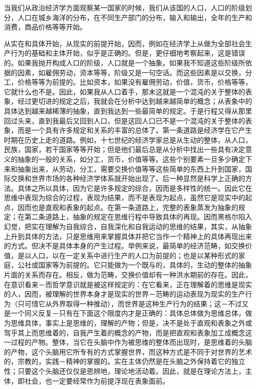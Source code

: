 \documentclass[a4paper,twoside,12pt]{ctexart}
\begin{document}
当我们从政治经济学方面观察某一国家的时候，我们从该国的人口，人口的阶级划分，人口在城乡海洋的分布，在不同生产部门的分布，输入和输出，全年的生产和消费，商品价格等等开始。

从实在和具体开始，从现实的前提开始，因而，例如在经济学上从做为全部社会生产行为的基础和主体开始，似乎是正确的。但是，更仔细地考察起来，这是错误的。如果我抛开构成人口的阶级，人口就是一个抽象。如果我不知道这些阶级所依据的因素，如雇佣劳动，资本等等，阶级又是一句空话。而这些因素是以交换，分工，价格等等为前提的。比如资本，如果没有雇佣劳动，价值，货币，价格等等，它就什么也不是。因此，如果我从人口着手，那末这就是一个混沌的关于整体的表象，经过更切进的规定之后，我就会在分析中达到越来越简单的概念；从表象中的具体达到越来越稀薄的抽象，直到我达到一些最简单的规定。于是行程又得从那里回过头来，直到我最后又回到人口，但是这回人口已不是一个混沌的关于整体的表象，而是一个具有许多规定和关系的丰富的总体了。第一条道路是经济学在它产生时期在历史上走的道路。例如，十七世纪的经济学家总是从生动的整体，从人口，民族，国家，若干国家等等开始；但是他们最后总是从分析中找出一些具有决定意义的抽象的一般的关系，如分工，货币，价值等等。这些个别要素一旦多少确定下来和抽象出来，从劳动，分工，需要交换价值等等这些简单的东西上升到国家，国际交换和世界市场的各种经济学体系就开始出现了。后一种显然是科学上正确的方法。具体之所以具体，因为它是许多规定的综合，因而是多样性的统一。因此它在思维中表现为综合的过程，表现为结果，而不是表现为起点，虽然它是现实中的起点，因而也是直观和表象的起点。在第一条道路上，完整的表象蒸发为抽象的规定；在第二条道路上，抽象的规定在思维行程中导致具体的再现。因而黑格尔陷入幻觉，把实在理解为自我综合，自我深化和自我运动的思维的结果，其实，从抽象上升到具体的方法，只是思维用来掌握具体并把它当作一个精神上的具体再现出来的方式。但决不是具体本身的产生过程。举例来说，最简单的经济范畴，如交换价值，是以人口，以在一定关系中进行生产的人口为前提的；也是以某种形式的家庭，公社或国家等为前提的。它只能做为一个既与的，具体的，生动的整体的抽象片面的关系而存在。相反，做为范畴，交换价值却有一种洪水期前的存在。因此，在意识看来－而哲学意识就是被这样规定的：在它看来，正在理解着的思维是现实的人，因而，被理解的世界本身才是现实的世界－范畴的运动表现为现实的生产行为（只可惜它从外界取得一种推动），而世界是这种生产行为的结果；这－不过又是一个同义反复－只有在下面这个限度内才是正确的：具体总体做为思维总体，做为思维具体，事实上是思维的，理解的产物；但是，决不是处于直观和表象之外或驾乎其上而思维着的，自我产生着的概念的产物，而是把直观和表象加工成概念这一过程的产物。整体，当它在头脑中作为被思维的整体而出现时，是思维着的头脑的产物，这个头脑用它所专有的方式掌握世界，而这种方式是不同于对世界的艺术的，宗教的，实践－精神的掌握的。实在主体仍然是在头脑之外保持着它的独立性；只要这个头脑还仅仅是思辨地，理论地活动着。因此，就是在理论方法上，主体，即社会，也一定要经常作为前提浮现在表象面前。
\end{document}
